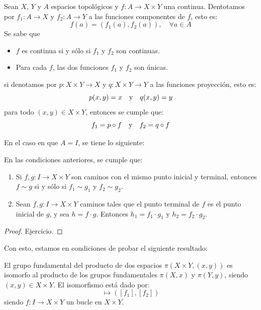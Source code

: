 \documentclass[12pt]{report}
\theoremstyle{largebreak}
\newcommand\cf[3]{\ensuremath{#1:#2\rightarrow#3}}
\begin{document}
    Sean $X$, $Y$ y $A$ espacios topológicos y $\cf{f}{A}{X\times Y}$ una  continua. Dentotamos por $\cf{f_1}{A}{X}$ y $\cf{f_2}{A}{Y}$ a las funciones componentes de $f$, esto es:
    \begin{equation*}
        f(a)=(f_1(a),f_2(a)),\quad\forall a\in A
    \end{equation*}
    Se sabe que
    \begin{itemize}
        \item $f$ es continua si y sólo si $f_1$ y $f_2$ son continuas.
        \item Para cada $f$, las dos funciones $f_1$ y $f_2$ son únicas.
    \end{itemize}
    si denotamos por $\cf{p}{X\times Y}{X}$ y $\cf{q}{X\times Y}{Y}$ a las funciones proyección, esto es:
    \begin{equation*}
        p(x,y)=x\quad\textup{y}\quad q(x,y)=y
    \end{equation*}
    para todo $(x,y)\in X\times Y$, entonces se cumple que:
    \begin{equation*}
        f_1=p\circ f\quad\textup{y}\quad f_2=q\circ f
    \end{equation*}

    En el caso en que $A=I$, se tiene lo siguiente:

    \begin{propo}
        En las condiciones anteriores, se cumple que:
        \renewcommand{\theenumi}{\alph{enumi}}
        \begin{enumerate}
            \item Si $\cf{f,g}{I}{X\times Y}$ son caminos con el mismo punto inicial y terminal, entonces $f\sim g$ si y sólo si $f_1\sim g_1$ y $f_2\sim g_2$.
            \item Sean $\cf{f,g}{I}{X\times Y}$ caminos tales que el punto terminal de $f$ es el punto inicial de $g$, y sea $h=f\cdot g$. Entonces $h_1=f_1\cdot g_1$ y $h_2=f_2\cdot g_2$.
        \end{enumerate}
    \end{propo}

    \begin{proof}
        Ejercicio.
    \end{proof}

    Con esto, estamos en condiciones de probar el siguiente resultado:

    \begin{theor}
        El grupo fundamental del producto de dos espacios $\pi(X\times Y, (x,y))$ es isomorfo al producto de los grupos fundamentales $\pi(X,x)$ y $\pi(Y,y)$, siendo $(x,y)\in X\times Y$. El isomorfismo está dado por:
        \begin{equation*}
            [f]\mapsto ([f_1],[f_2])
        \end{equation*}
        siendo $\cf{f}{I}{X\times Y}$ un bucle en $X\times Y$.
    \end{theor}
\end{document}
